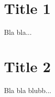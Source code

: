 \documentclass[]{klokurier}
\begin{document}
\newcommand{\thedate}{Januar 2017}
\header%
\section*{Title 1}
Bla bla...
\signature{reki}
\section*{Title 2}
Bla bla blubb...
\signature{reki}
\end{document}
